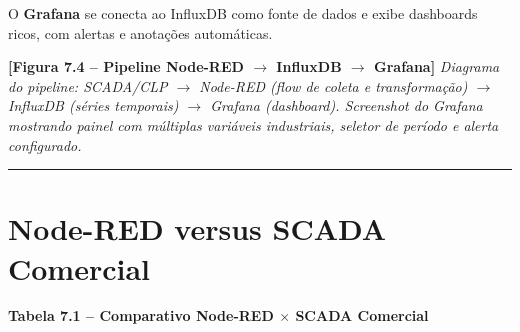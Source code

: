 O \textbf{Grafana} se conecta ao InfluxDB como fonte de dados e exibe dashboards ricos, com alertas e anotações automáticas.

\begin{caixafigura}

\textbf{{[}Figura 7.4 -- Pipeline Node-RED \ensuremath{\rightarrow} InfluxDB \ensuremath{\rightarrow} Grafana{]}}
\emph{Diagrama do pipeline: SCADA/CLP \ensuremath{\rightarrow} Node-RED (flow de coleta e transformação) \ensuremath{\rightarrow} InfluxDB (séries temporais) \ensuremath{\rightarrow} Grafana (dashboard). Screenshot do Grafana mostrando painel com múltiplas variáveis industriais, seletor de período e alerta configurado.}

\end{caixafigura}

\begin{center}\rule{0.5\linewidth}{0.5pt}\end{center}

\section{Node-RED versus SCADA Comercial}\label{node-red-versus-scada-comercial}

\textbf{Tabela 7.1 -- Comparativo Node-RED \ensuremath{\times} SCADA Comercial}

